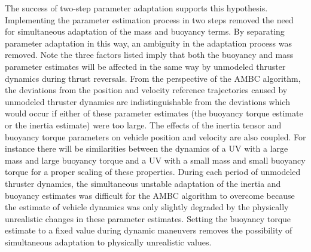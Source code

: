 The success of two-step parameter adaptation supports this hypothesis.
%
Implementing the parameter estimation process in two steps removed
the need for simultaneous adaptation of the mass and buoyancy terms.
%
By separating parameter adaptation in this way, an ambiguity in the
adaptation process was removed.
%
Note the three factors listed imply that both the buoyancy and
mass parameter estimates will be affected in the same way by unmodeled
thruster dynamics during thrust reversals.  
%
From the perspective of the \ac{AMBC} algorithm, the deviations from
the position and velocity reference trajectories caused by unmodeled
thruster dynamics are indistinguishable from the deviations which
would occur if either of these parameter estimates (the buoyancy
torque estimate or the inertia estimate) were too large.
%
The effects of the inertia tensor and buoyancy torque parameters on
vehicle position and velocity are also coupled.
%
For instance there will be similarities between the dynamics of a
\ac{UV} with a large mass and large buoyancy torque and a \ac{UV} with
a small mass and small buoyancy torque for a proper scaling of these
properties.
%
During each period of unmodeled thruster dynamics, the simultaneous
unstable adaptation of the inertia and buoyancy estimates was
difficult for the \ac{AMBC} algorithm to overcome because the estimate
of vehicle dynamics was only slightly degraded by the physically
unrealistic changes in these parameter estimates.
%
Setting the buoyancy torque estimate to a fixed value during dynamic
maneuvers removes the possibility of simultaneous adaptation to
physically unrealistic values.






 








